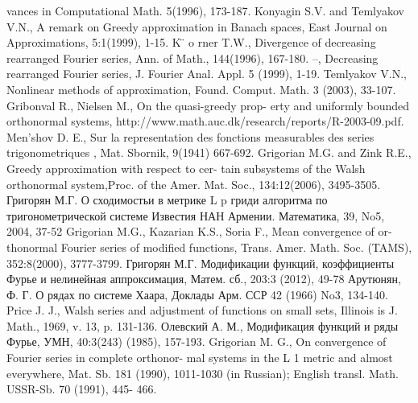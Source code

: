 \documentclass[15pt]{article}
\begin{document}
{{{{vances in Computational Math. 5(1996), 173-187.
\newline
[12] Konyagin S.V. and Temlyakov V.N., A remark on Greedy approximation
in Banach spaces, East Journal on Approximations, 5:1(1999), 1-15.
\newline
[13] K ̈
o rner T.W., Divergence of decreasing rearranged Fourier series, Ann. of
Math., 144(1996), 167-180.
\newline
[14] –, Decreasing rearranged Fourier series, J. Fourier Anal. Appl. 5 (1999),
1-19.
\newline
[15] Temlyakov V.N., Nonlinear methods of approximation, Found. Comput.
Math. 3 (2003), 33-107.
\newline
[16] Gribonval
R.,
Nielsen
M.,
On
the
quasi-greedy
prop-
erty
and
uniformly
bounded
orthonormal
systems,
http://www.math.auc.dk/research/reports/R-2003-09.pdf.
\newline
[17] Men’shov D. E., Sur la representation des fonctions measurables des series
trigonometriques , Mat. Sbornik, 9(1941) 667-692.
\newline
[18] Grigorian M.G. and Zink R.E., Greedy approximation with respect to cer-
tain subsystems of the Walsh orthonormal system,Proc. of the Amer. Mat.
Soc., 134:12(2006), 3495-3505.
\newline
[19] Григорян М.Г. О сходимостьи в метрике L p гриди алгоритма по
тригонометрической системе Известия НАН Армении. Математика,
39, No5, 2004, 37-52
\newline
[20] Grigorian M.G., Kazarian K.S., Soria F., Mean convergence of or-
thonormal Fourier series of modified functions, Trans. Amer. Math. Soc.
(TAMS), 352:8(2000), 3777-3799.
\newline
[21] Григорян М.Г. Модификации функций, коэффициенты Фурье и
нелинейная аппроксимация, Матем. сб., 203:3 (2012), 49-78
\newline
[22] Арутюнян, Ф. Г. О рядах по системе Хаара, Доклады Арм. ССР 42
(1966) No3, 134-140.
\newline
[23] Price J. J., Walsh series and adjustment of functions on small sets, Illinois
is J. Math., 1969, v. 13, p. 131-136.
\newline
[24] Олевский А. М., Модификация функций и ряды Фурье, УМН,
40:3(243) (1985), 157-193.
\newline
[25] Grigorian M. G., On convergence of Fourier series in complete orthonor-
mal systems in the L 1 metric and almost everywhere, Mat. Sb. 181 (1990),
1011-1030 (in Russian); English transl. Math. USSR-Sb. 70 (1991), 445-
466.
\newline
}}}}
\end{document}
